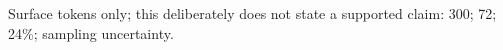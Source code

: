Surface tokens only; this deliberately does not state a supported claim: 300; 72; 24\%; sampling uncertainty.
